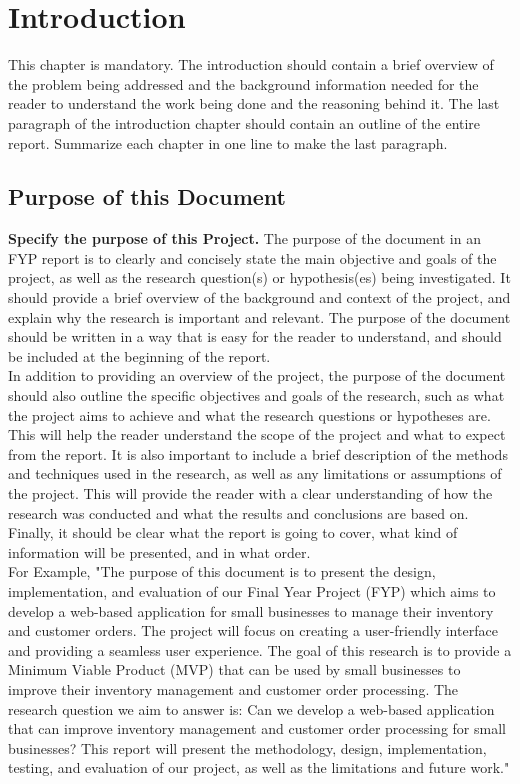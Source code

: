 \documentclass{FastFyp}
\begin{document}
\mainmatter


\chapter{Introduction}
This chapter is mandatory. The introduction should contain a brief overview of the problem being addressed and the background information needed for the reader to understand the work being done and the reasoning behind it.  
The last paragraph of the introduction chapter should contain an outline of the entire report.  Summarize each chapter in one line to make the last paragraph.
\section{Purpose of this Document}
\textbf{Specify the purpose of this Project.}
The purpose of the document in an FYP report is to clearly and concisely state the main objective and goals of the project, as well as the research question(s) or hypothesis(es) being investigated. It should provide a brief overview of the background and context of the project, and explain why the research is important and relevant. The purpose of the document should be written in a way that is easy for the reader to understand, and should be included at the beginning of the report.\\ In addition to providing an overview of the project, the purpose of the document should also outline the specific objectives and goals of the research, such as what the project aims to achieve and what the research questions or hypotheses are. This will help the reader understand the scope of the project and what to expect from the report. It is also important to include a brief description of the methods and techniques used in the research, as well as any limitations or assumptions of the project. This will provide the reader with a clear understanding of how the research was conducted and what the results and conclusions are based on. Finally, it should be clear what the report is going to cover, what kind of information will be presented, and in what order.\\
For Example, "The purpose of this document is to present the design, implementation, and evaluation of our Final Year Project (FYP) which aims to develop a web-based application for small businesses to manage their inventory and customer orders. The project will focus on creating a user-friendly interface and providing a seamless user experience. The goal of this research is to provide a Minimum Viable Product (MVP) that can be used by small businesses to improve their inventory management and customer order processing. The research question we aim to answer is: Can we develop a web-based application that can improve inventory management and customer order processing for small businesses? This report will present the methodology, design, implementation, testing, and evaluation of our project, as well as the limitations and future work."
\end{document}
